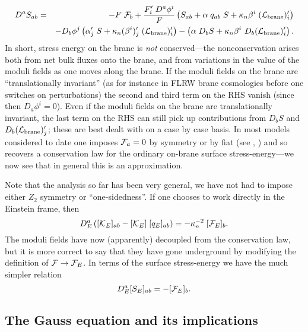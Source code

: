 \documentclass[a4paper,10pt]{article}
\begin{document}
{\begin{eqnarray}
D^a S_{ab} &=& 
-F \; {\mathcal F}_b + 
{F'_i \; D^a \phi^i \over F}
\left( 
S_{ab} + \alpha\;q_{ab}\;S + \kappa_n \beta^i \; ({\mathcal L}_{\mathrm{brane}})'_i
\right)
\nonumber\\
&&-
D_b \phi^j \left( 
\alpha'_j \;S + \kappa_n (\beta^i)'_j \; ({\mathcal L}_{\mathrm{brane}})'_i
\right)
-
\left( 
\alpha \;D_b S + \kappa_n \beta^i \ D_b ({\mathcal L}_{\mathrm{brane}})'_i 
\right).
\label{E:non-conservation}
\end{eqnarray}
%
In short, stress energy on the brane is {\emph{not}} conserved---the
nonconservation arises both from net bulk fluxes onto the brane, and
from variations in the value of the moduli fields as one moves along
the brane. If the moduli fields on the brane are ``translationally
invariant'' (as for instance in FLRW brane cosmologies before one
switches on perturbations) the second and third term on the RHS
vanish (since then $D_a \phi^i=0$).  Even if the moduli fields on
the brane are translationally invariant, the last term on the RHS can
still pick up contributions from $D_b S$ and $D_b ({\mathcal L}_{\mathrm{brane}})'_j$;
these are best dealt with on a case by case basis.  In most models
considered to date one imposes ${\mathcal F}_a=0$ by symmetry or by fiat (see
\eg, \cite{Shiromizu}) and so recovers a conservation law for the ordinary
on-brane surface stress-energy---we now see that in general this is an
approximation.

Note that the analysis so far has been very general, we have not had
to impose either $Z_2$ symmetry or ``one-sidedness''. If one chooses
to work directly in the Einstein frame, then
%
\begin{equation}
D^a_E \left([{\mathcal K}_E]_{ab} - [{\mathcal K}_E] \; [q_E]_{ab} \right)= 
-\kappa_n^{-2}  \; [{\mathcal F}_E]_b.
\end{equation}
%
The moduli fields have now (apparently) decoupled from the
conservation law, but it is more correct to say that they have gone
underground by modifying the definition of ${\mathcal F}\to{\mathcal F}_E$. In terms of
the surface stress-energy we have the much simpler relation
%
\begin{equation}
D^a_E [S_E]_{ab} =  -[{\mathcal F}_E]_b.
\label{E:codazzi-in-einstein}
\end{equation}
%

\subsection{The Gauss equation and its implications}


}
\end{document}
